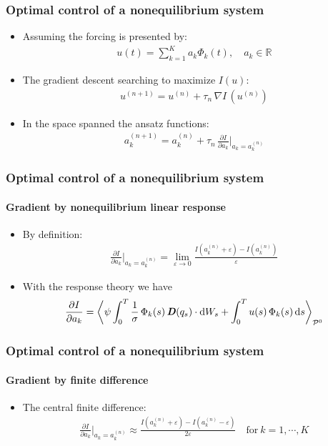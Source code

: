 \documentclass[fleqn]{beamer}
\newcommand{\bluec}[1]{{\color{blue} #1}}
\newcommand{\vect}[1]{\textbf{\textit{#1}}}
\newcommand{\dd}[0]{\textrm{d}}
\newcommand{\eps}{\varepsilon}
\newcommand{\pathmeas}{\mathcal P}
\begin{document}
\begin{frame}
  \frametitle{Optimal control of a nonequilibrium system}
  \begin{itemize}
  \item<1-> 
    Assuming the forcing is presented by:
    \bluec{
      \begin{align*}
        u(t) = \sum_{k = 1}^K a_k\Phi_k(t), \quad a_k\in \mathbb R
      \end{align*}
    }
  \item<2-> The gradient descent searching to maximize \bluec{$I(u)$}:
    \bluec{
      \begin{align*}
        u^{(n+1)} = u^{(n)} + \tau_n \,\nabla I\,(u^{(n)})
      \end{align*}
    }
  \item<3-> In the space spanned the ansatz functions:
    \bluec{
      \begin{align*}
        a_k^{(n+1)}   = a_k^{(n)} +
        \tau_n \,\frac{\partial I}{\partial a_k} \bigg\vert_{a_k = a_k^{(n)}}
      \end{align*}
    }
  \end{itemize}
\end{frame}


\begin{frame}
  \frametitle{Optimal control of a nonequilibrium system}
  \framesubtitle{Gradient by nonequilibrium linear response}
  \begin{itemize}
  \item<1-> By definition:
    \bluec{
      \begin{align*}
        \frac{\partial I}{\partial a_k}\bigg\vert_{a_k = a_k^{(n)}}
        =
        \lim_{\eps\rightarrow 0}\frac{I(a_k^{(n)} + \eps) - I(a_k^{(n)})}{\eps}   
      \end{align*}
    }
  \item<2-> With the response theory we have
    \bluec{
      \begin{align*}
        \frac{\partial I}{\partial a_k} =
        \bigg\langle
        \psi \int_0^T\frac1\sigma\,\Phi_k(s)\,\vect D(q_s)\cdot \dd W_s
        +
        \int_0^T u(s)\,\Phi_k(s)\,\dd s
        \bigg\rangle_{\pathmeas^0}
      \end{align*}
    }
  \end{itemize}
\end{frame}

\begin{frame}
  \frametitle{Optimal control of a nonequilibrium system}
  \framesubtitle{Gradient by finite difference}
  \begin{itemize}
  \item<1-> The central finite difference:
    \bluec{
      \begin{align*}
        \frac{\partial I}{\partial a_k}\bigg\vert_{a_k = a_k^{(n)}}
        \approx
        \frac{I(a_k^{(n)} + \eps) - I(a_k^{(n)} - \eps)}{2\eps}
        \quad \textrm{for}\ k=1,\cdots,K
      \end{align*}
    }
  \end{itemize}
\end{frame}
\end{document}
